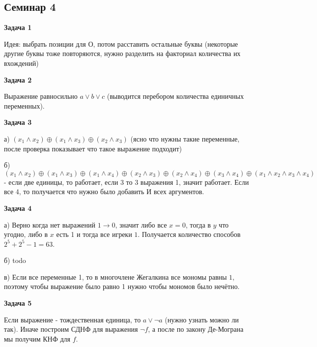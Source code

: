 \subsection{Семинар 4}
\begin{center}
\textbf{Задача 1}
\end{center}
Идея: выбрать позиции для О, потом расставить остальные буквы (некоторые другие буквы тоже повторяются, нужно разделить на факториал количества их вхождений)

\begin{center}
\textbf{Задача 2}
\end{center}
Выражение равносильно $\displaystyle a\lor b\lor c$ (выводится перебором количества единичных переменных).

\begin{center}
\textbf{Задача 3}
\end{center}
а) $\displaystyle ( x_{1} \land x_{2}) \oplus ( x_{1} \land x_{3}) \oplus ( x_{2} \land x_{3})$ (ясно что нужны такие переменные, после проверка показывает что такое выражение подходит)

б) $\displaystyle ( x_{1} \land x_{2}) \oplus ( x_{1} \land x_{3}) \oplus ( x_{1} \land x_{4}) \oplus ( x_{2} \land x_{3}) \oplus ( x_{2} \land x_{4}) \oplus ( x_{3} \land x_{4}) \oplus ( x_{1} \land x_{2} \land x_{3} \land x_{4})$ - если две единицы, то работает, если 3 то 3 выражения 1, значит работает. Если все 4, то получается что нужно было добавить И всех аргументов.

\begin{center}
\textbf{Задача 4}
\end{center}
а) Верно когда нет выражений $\displaystyle 1\rightarrow 0$, значит либо все $\displaystyle x=0$, тогда в $\displaystyle y$ что угодно, либо в $\displaystyle x$ есть 1 и тогда все игреки $\displaystyle 1$. Получается количество способов $\displaystyle 2^{5} +2^{5} -1=63$.

б) todo

в) Если все переменные 1, то в многочлене Жегалкина все мономы равны $\displaystyle 1$, поэтому чтобы выражение было равно 1 нужно чтобы мономов было нечётно.

\begin{center}
\textbf{Задача 5}
\end{center}
Если выражение - тождественная единица, то $\displaystyle a\lor \neg a$ (нужно узнать можно ли так). Иначе построим СДНФ для выражения $\displaystyle \neg f$, а после по закону Де-Мограна мы получим КНФ для $\displaystyle f$.

